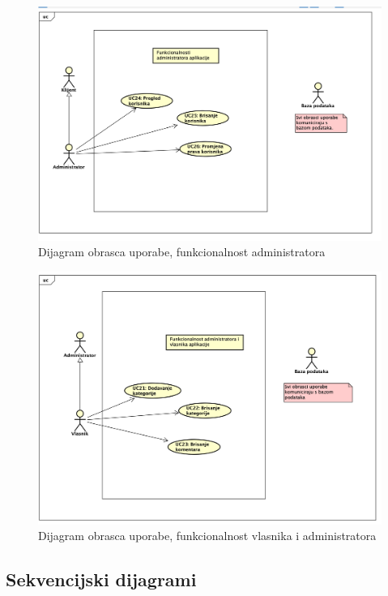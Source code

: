 				\begin{figure}[H]
					\includegraphics[scale=0.6]{dijagrami/Administrator.png} 
					\centering
					\caption{Dijagram obrasca uporabe, funkcionalnost administratora}
					\label{fig:administrator}
				\end{figure}		
				\eject 
				\begin{figure}[H]
					\includegraphics[scale=0.6]{dijagrami/Vlasnik.png} 
					\centering
					\caption{Dijagram obrasca uporabe, funkcionalnost vlasnika i administratora}
					\label{fig:vlasnik}
				\end{figure}		
				\eject 

			\subsection{Sekvencijski dijagrami}
				
